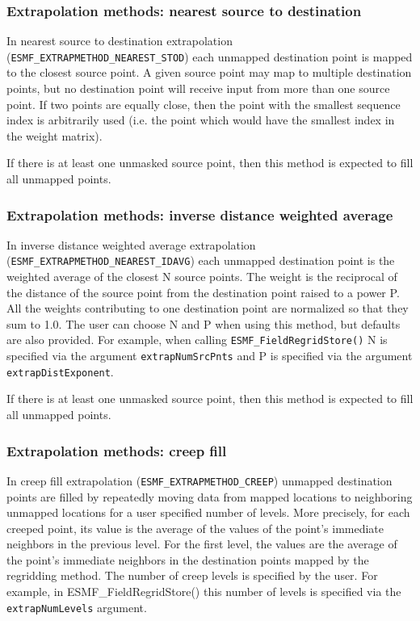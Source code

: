 \subsubsection{Extrapolation methods: nearest source to destination}\label{sec:extrapolation:neareststod}
In nearest source to destination extrapolation ({\tt ESMF\_EXTRAPMETHOD\_NEAREST\_STOD}) each unmapped 
destination point is mapped to the closest source point. A given source point may map to 
multiple destination points, but no destination point will receive input from more than one source point. 
If two points are equally close, then the point with the smallest sequence index is arbitrarily used 
(i.e. the point which would have the smallest index in the weight matrix). 

If there is at least one unmasked source point, then this method is expected to fill all unmapped points. 

\subsubsection{Extrapolation methods: inverse distance weighted average}\label{sec:extrapolation:nearestidavg}
In inverse distance weighted average extrapolation ({\tt ESMF\_EXTRAPMETHOD\_NEAREST\_IDAVG}) each unmapped 
destination point is the weighted average of the closest N source points. The weight is 
the reciprocal of the distance of the source point from the destination point raised to a power P.
All the weights contributing to one destination point are normalized so that they sum to 1.0. 
The user can choose N and P when using this method, but defaults are also provided. For example, when 
calling {\tt ESMF\_FieldRegridStore()} N is specified via the argument {\tt extrapNumSrcPnts} and 
P is specified via the argument {\tt extrapDistExponent}.  

If there is at least one unmasked source point, then this method is expected to fill all unmapped points. 

\subsubsection{Extrapolation methods: creep fill}\label{sec:extrapolation:creep}
In creep fill extrapolation ({\tt ESMF\_EXTRAPMETHOD\_CREEP}) unmapped destination points are filled by 
repeatedly moving data from mapped locations to neighboring unmapped locations for a user specified 
number of levels. More precisely, for each creeped point, its value is the average of the values of the 
point's immediate neighbors in the previous level. For the first level, the values are the average of the 
point's immediate neighbors in the destination points mapped by the regridding method. The number of creep levels
is specified by the user. For example, in ESMF\_FieldRegridStore() this number of levels is specified 
via the {\tt extrapNumLevels} argument. 

